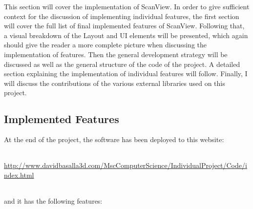 \documentclass[a4paper,11pt,twoside]{article}
\begin{document}
This section will cover the implementation of ScanView. In order to give sufficient context for the discussion of implementing individual features, the first section will cover the full list of final implemented features of ScanView. Following that, a visual breakdown of the Layout and UI elements will be presented, which again should give the reader a more complete picture when discussing the implementation of features. Then the general development strategy will be discussed as well as the general structure of the code of the project. A detailed section explaining the implementation of individual features will follow. Finally, I will discuss the contributions of the various external libraries used on this project.

\subsection{Implemented Features}

At the end of the project, the software has been deployed to this website:

\noindent
\\
\url{http://www.davidbasalla3d.com/MscComputerScience/IndividualProject/Code/index.html}

\noindent
\\
and it has the following features:
\end{document}
